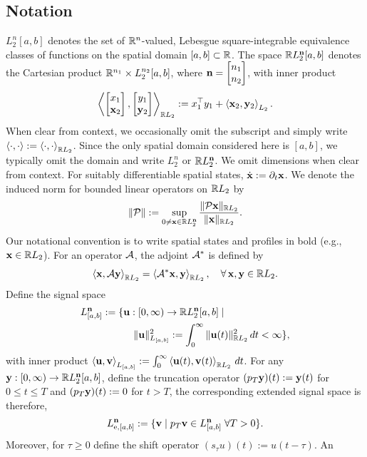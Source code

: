 
\subsection{Notation}
$L_2^n[a,b]$ denotes the set of $\mathbb{R}^n$-valued, Lebesgue square-integrable
equivalence classes of functions on the spatial domain $[a,b]\subset\mathbb{R}$. The
space $\mathbb{R} L_2^{\mathbf{n}}[a,b]$ denotes the Cartesian product $\mathbb{R}^{n_1} \times
L_2^{n_2}[a,b]$, where $\mathbf{n} = \begin{bmatrix}n_1 \\ n_2\end{bmatrix}$, with inner product
\begin{equation*}
\left\langle \begin{bmatrix}x_1 \\ \mathbf{x}_2\end{bmatrix}, \begin{bmatrix}y_1 \\ \mathbf{y}_2\end{bmatrix} \right\rangle_{\mathbb{R} L_2}
:= x_1^\top y_1 + \left\langle \mathbf{x}_2, \mathbf{y}_2 \right\rangle_{L_2}.
\end{equation*} When clear from context, we occasionally omit the subscript and
simply write $\left\langle \cdot, \cdot \right\rangle := \left\langle \cdot, \cdot \right\rangle_{\mathbb{R} L_2}$. Since the only
spatial domain considered here is $[a,b]$, we typically omit the domain and
write $L_2^n$ or $\mathbb{R} L_2^{\mathbf{n}}$. We omit dimensions when clear from context.
For suitably differentiable spatial states, $\dot{\mathbf{x}}:=\partial_t\mathbf{x}$.
We denote the induced norm for
bounded linear operators on $\mathbb{R} L_2$ by
\[
\|\mathcal{P}\|
:=\sup_{0\neq\mathbf{x}\in\mathbb{R} L_2^{\mathbf{n}}}
\frac{\|\mathcal{P}\mathbf{x}\|_{\mathbb{R} L_2}}{\|\mathbf{x}\|_{\mathbb{R} L_2}}.
\]
Our notational convention is to write
spatial states and profiles in bold (e.g., $\mathbf{x}\in\mathbb{R} L_2$).
For an operator $\mathcal{A}$, the adjoint $\mathcal{A}^*$ is defined by
\[
\left\langle \mathbf{x}, \mathcal{A} \mathbf{y} \right\rangle_{\mathbb{R} L_2} = \left\langle \mathcal{A}^* \mathbf{x}, \mathbf{y} \right\rangle_{\mathbb{R} L_2},
\quad \forall\, \mathbf{x},\mathbf{y} \in \mathbb{R} L_2.
\]
Define the signal space
\begin{align*}
L_{[a,b]}^{\mathbf{n}}:=\{&\mathbf{u}:[0,\infty)\to\mathbb{R} L_2^{\mathbf{n}}[a,b] \mid\\&\quad\|\mathbf{u}\|_{L_{[a,b]}}^2:=\int_0^{\infty}\|\mathbf{u}(t)\|_{\mathbb{R} L_2}^2\,dt<\infty\}, 
\end{align*}
with inner product $\left\langle \mathbf{u}, \mathbf{v} \right\rangle_{L_{[a,b]}}:=\int_0^{\infty}\left\langle \mathbf{u}(t), \mathbf{v}(t) \right\rangle_{\mathbb{R} L_2}\,dt$. 
For any $\mathbf{y}:[0,\infty)\to\mathbb{R} L_2^{\mathbf{n}}[a,b]$,
define the truncation operator $(p_T\mathbf{y})(t):=\mathbf{y}(t)$ 
for $0\leq t\leq T$ and $(p_T\mathbf{y})(t):=0$ for $t>T$,
the corresponding extended signal space is therefore,
\begin{align*}
L_{{\mathrm{e}},[a,b]}^{\mathbf{n}}:=\{\mathbf{v} \mid p_T\mathbf{v}\in L_{[a,b]}^{\mathbf{n}} \;\forall T>0\}.
\end{align*}
Moreover, for $\tau\geq0$ define the shift operator $(s_\tau u)(t):=u(t-\tau)$. An
